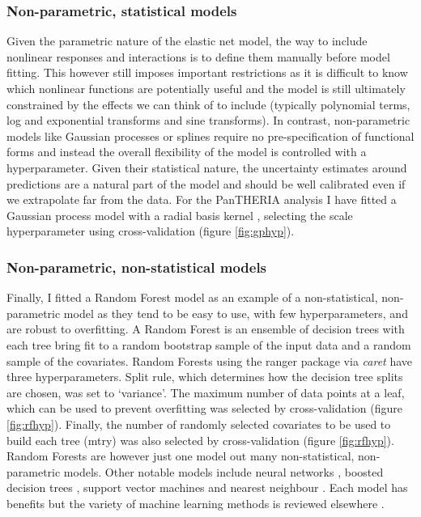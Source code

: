 \documentclass[10pt,]{article}
\begin{document}
\subsubsection{Non-parametric, statistical models}\label{non-parametric-statistical-models}

Given the parametric nature of the elastic net model, the way to include nonlinear responses and interactions is to define them manually before model fitting.
This however still imposes important restrictions as it is difficult to know which nonlinear functions are potentially useful and the model is still ultimately constrained by the effects we can think of to include (typically polynomial terms, log and exponential transforms and sine transforms).
In contrast, non-parametric models like Gaussian processes \citep{rasmussen2004gaussian} or splines \citep{splines} require no pre-specification of functional forms and instead the overall flexibility of the model is controlled with a hyperparameter.
Given their statistical nature, the uncertainty estimates around predictions are a natural part of the model and should be well calibrated even if we extrapolate far from the data.
For the PanTHERIA analysis I have fitted a Gaussian process model with a radial basis kernel \citep{kernlab}, selecting the scale hyperparameter using cross-validation (figure \ref{fig:gphyp}).

\subsubsection{Non-parametric, non-statistical models}\label{non-parametric-non-statistical-models}

Finally, I fitted a Random Forest model \citep{breiman2001random, wright2015ranger} as an example of a non-statistical, non-parametric model as they tend to be easy to use, with few hyperparameters, and are robust to overfitting.
A Random Forest is an ensemble of decision trees with each tree bring fit to a random bootstrap sample of the input data and a random sample of the covariates.
Random Forests using the ranger \citep{wright2015ranger} package via \emph{caret} have three hyperparameters.
Split rule, which determines how the decision tree splits are chosen, was set to `variance'.
The maximum number of data points at a leaf, which can be used to prevent overfitting was selected by cross-validation (figure \ref{fig:rfhyp}).
Finally, the number of randomly selected covariates to be used to build each tree (mtry) was also selected by cross-validation (figure \ref{fig:rfhyp}).
Random Forests are however just one model out many non-statistical, non-parametric models.
Other notable models include neural networks \citep{neuralnets}, boosted decision trees \citep{friedman2001greedy}, support vector machines \citep{svm} and nearest neighbour \citep{altman1992introduction}.
Each model has benefits but the variety of machine learning methods is reviewed elsewhere \citep{crisci2012review}.
\end{document}

